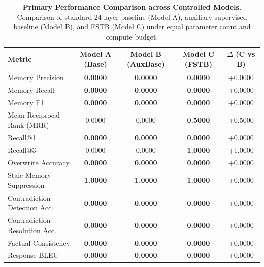 \begin{table}[htbp]
\centering
\caption{\textbf{Primary Performance Comparison across Controlled Models.} Comparison of standard 24-layer baseline (Model A), auxiliary-supervised baseline (Model B), and FSTB (Model C) under equal parameter count and compute budget.}
\label{tab:primary_comparison}
\begin{tabular}{l c c c c}
\toprule
\textbf{Metric} & \textbf{Model A (Base)} & \textbf{Model B (AuxBase)} & \textbf{Model C (FSTB)} & \textbf{$\Delta$ (C vs B)} \\
\midrule
Memory Precision               & \textbf{0.0000} & \textbf{0.0000} & \textbf{0.0000} & +0.0000 \\
Memory Recall                  & \textbf{0.0000} & \textbf{0.0000} & \textbf{0.0000} & +0.0000 \\
Memory F1                      & \textbf{0.0000} & \textbf{0.0000} & \textbf{0.0000} & +0.0000 \\
Mean Reciprocal Rank (MRR)     & 0.0000 & 0.0000 & \textbf{0.5000} & +0.5000 \\
Recall@1                       & \textbf{0.0000} & \textbf{0.0000} & \textbf{0.0000} & +0.0000 \\
Recall@3                       & 0.0000 & 0.0000 & \textbf{1.0000} & +1.0000 \\
Overwrite Accuracy             & \textbf{0.0000} & \textbf{0.0000} & \textbf{0.0000} & +0.0000 \\
Stale Memory Suppression       & \textbf{1.0000} & \textbf{1.0000} & \textbf{1.0000} & +0.0000 \\
Contradiction Detection Acc.   & \textbf{0.0000} & \textbf{0.0000} & \textbf{0.0000} & +0.0000 \\
Contradiction Resolution Acc.  & \textbf{0.0000} & \textbf{0.0000} & \textbf{0.0000} & +0.0000 \\
Factual Consistency            & \textbf{0.0000} & \textbf{0.0000} & \textbf{0.0000} & +0.0000 \\
Response BLEU                  & \textbf{0.0000} & \textbf{0.0000} & \textbf{0.0000} & +0.0000 \\
\bottomrule
\end{tabular}
\end{table}
